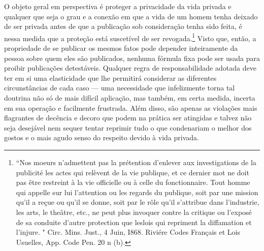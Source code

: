 O objeto geral em perspectiva é proteger a privacidade da vida privada e
qualquer que seja o grau e a conexão em que a vida de um homem tenha
deixado de ser privada antes de que a publicação sob consideração tenha
sido feita, é nessa medida que a proteção está suscetível de ser
revogada.\footnote{``Nos moeurs n'admettent pas la prétention d'enlever
  aux investigations de la publicité les actes qui relèvent de la vie
  publique, et ce dernier mot ne doit pas être restreint à la vie
  officielle ou à celle du fonctionnaire. Tout homme qui appelle sur lui
  l'attention ou les regards du publique, soit par une mission qu'il a
  reçue ou qu'il se donne, soit par le rôle qu'il s'attribue dans
  l'industrie, les arts, le theâtre, etc., ne peut plus invoquer contre
  la critique ou l'exposé de sa conduite d'autre protection que leslois
  qui repriment la diffamation et l'injure. " Circ. Mins. Just., 4 Juin,
  I868. Riviére Codes Français et Lois Usuelles, App. Code Pen. 20 n
  (b).} Visto que, então, a propriedade de se publicar os mesmos fatos
pode depender inteiramente da pessoa sobre quem eles são publicados,
nenhuma fórmula fixa pode ser usada para proibir publicações
detestáveis. Qualquer regra de responsabilidade adotada deve ter em si
uma elasticidade que lhe permitirá considerar as diferentes
circunstâncias de cada caso --- uma necessidade que infelizmente torna
tal doutrina não só de mais difícil aplicação, mas também, em certa
medida, incerta em sua operação e facilmente frustrada. Além disso, são
apenas as violações mais flagrantes de decência e decoro que podem na
prática ser atingidas e talvez não seja desejável nem sequer tentar
reprimir tudo o que condenariam o melhor dos gostos e o mais agudo senso
do respeito devido à vida privada.

